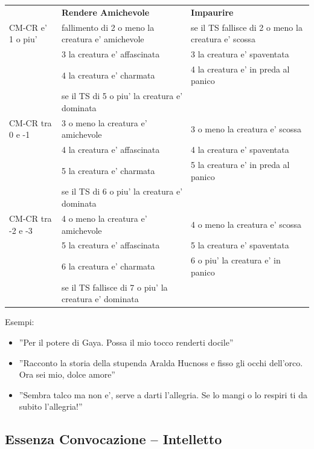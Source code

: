 \documentclass[a4paper,11pt,twoside,openany]{book}
\begin{document}
	\begin{tabular}{L{2.5cm} L{7cm} L{7cm}}
		\toprule
		& \textbf{Rendere Amichevole} & \textbf{Impaurire}\tabularnewline
		CM-CR e' 1 o piu' & fallimento di 2 o meno la creatura e' amichevole & se il TS fallisce di 2 o meno la creatura e' scossa\tabularnewline
		& 3 la creatura e' affascinata & 3 la creatura e' spaventata\tabularnewline
		& 4 la creatura e' charmata & 4 la creatura e' in preda al panico\tabularnewline
		& se il TS di 5 o piu' la creatura e' dominata & \tabularnewline
		CM-CR tra 0 e -1 & 3 o meno la creatura e' amichevole & 3 o meno la creatura e' scossa\tabularnewline
		& 4 la creatura e' affascinata & 4 la creatura e' spaventata\tabularnewline
		& 5 la creatura e' charmata & 5 la creatura e' in preda al panico\tabularnewline
		& se il TS di 6 o piu' la creatura e' dominata & \tabularnewline
		CM-CR tra -2 e -3 & 4 o meno la creatura e' amichevole & 4 o meno la creatura e' scossa\tabularnewline
		& 5 la creatura e' affascinata & 5 la creatura e' spaventata\tabularnewline
		& 6 la creatura e' charmata & 6 o piu' la creatura e' in panico\tabularnewline
		& se il TS fallisce di 7 o piu' la creatura e' dominata & \tabularnewline
	\end{tabular}
	
	
	\bigskip
	
	Esempi:
	\begin{itemize}
		\item 
		''Per il potere di Gaya. Possa il mio tocco renderti docile'' 
		\item 
		''Racconto la storia della stupenda Aralda Hucnoss e fisso gli occhi dell'orco. Ora sei mio, dolce amore'' 
		\item 
		''Sembra talco ma non e', serve a darti l'allegria. Se lo mangi o lo respiri ti da subito l'allegria!'' 
	\end{itemize}
	
	\pagebreak
	
	\subsection{Essenza Convocazione -- Intelletto}
	
	
	\label{essenza-convocazione---intelletto}
	
\end{document}
